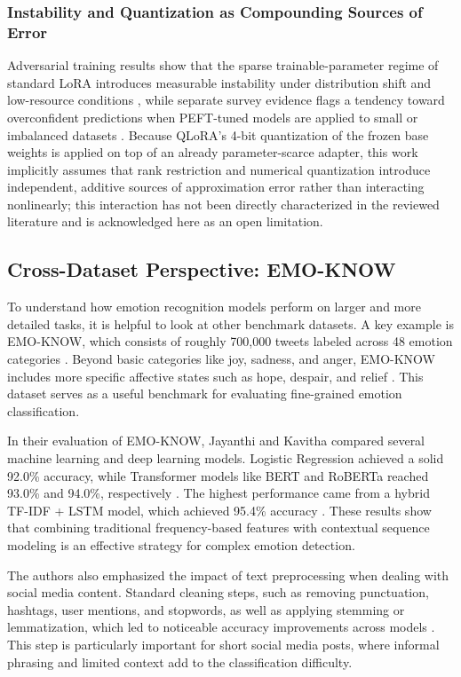 \documentclass[conference]{IEEEtran}
\begin{document}
\subsubsection{Instability and Quantization as Compounding Sources of Error}
Adversarial training results show that the sparse trainable-parameter regime of standard LoRA introduces measurable instability under distribution shift and low-resource conditions \cite{wu2025advlora}, while separate survey evidence flags a tendency toward overconfident predictions when PEFT-tuned models are applied to small or imbalanced datasets \cite{wang2025peft}. Because QLoRA's 4-bit quantization of the frozen base weights is applied on top of an already parameter-scarce adapter, this work implicitly assumes that rank restriction and numerical quantization introduce independent, additive sources of approximation error rather than interacting nonlinearly; this interaction has not been directly characterized in the reviewed literature and is acknowledged here as an open limitation.

\subsection{Cross-Dataset Perspective: EMO-KNOW}

To understand how emotion recognition models perform on larger and more detailed tasks, it is helpful to look at other benchmark datasets. A key example is EMO-KNOW, which consists of roughly 700,000 tweets labeled across 48 emotion categories \cite{Jayanthi_Kavitha_2026}. Beyond basic categories like joy, sadness, and anger, EMO-KNOW includes more specific affective states such as hope, despair, and relief \cite{Jayanthi_Kavitha_2026}. This dataset serves as a useful benchmark for evaluating fine-grained emotion classification.

In their evaluation of EMO-KNOW, Jayanthi and Kavitha \cite{Jayanthi_Kavitha_2026} compared several machine learning and deep learning models. Logistic Regression achieved a solid 92.0\% accuracy, while Transformer models like BERT and RoBERTa reached 93.0\% and 94.0\%, respectively \cite{Jayanthi_Kavitha_2026}. The highest performance came from a hybrid TF-IDF + LSTM model, which achieved 95.4\% accuracy \cite{Jayanthi_Kavitha_2026}. These results show that combining traditional frequency-based features with contextual sequence modeling is an effective strategy for complex emotion detection.

The authors also emphasized the impact of text preprocessing when dealing with social media content. Standard cleaning steps, such as removing punctuation, hashtags, user mentions, and stopwords, as well as applying stemming or lemmatization, which led to noticeable accuracy improvements across models \cite{Jayanthi_Kavitha_2026}. This step is particularly important for short social media posts, where informal phrasing and limited context add to the classification difficulty.
\end{document}
